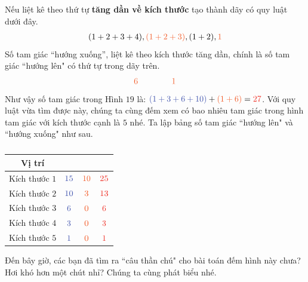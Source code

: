 Nếu liệt kê theo thứ tự {\bf\color{toancuabi} tăng dần về kích thước} tạo thành dãy có quy luật dưới đây.
\begin{align*}
	(1+2+3+4), {\color{duongvaotoanhoc}{(1+2+3)}}, (1+2), {\color{duongvaotoanhoc}{1}}
\end{align*}
Số tam giác “hướng xuống”, liệt kê theo kích thước tăng dần, chính là số tam giác ``hướng lên" có thứ tự {\color{duongvaotoanhoc}{chẵn}} trong dãy trên.
\begin{align*}
	{\color{duongvaotoanhoc}{6}	\qquad \qquad	1 }
\end{align*}
Như vậy số tam giác trong Hình $19$ là: ${\color{timhieukhoahoc}{(1+3+6+10)}} + {\color{duongvaotoanhoc}{(1+6)}} = {\color{toanhocdoisong}{27}}$.
\vskip 0.1cm
Với quy luật vừa tìm được này, chúng ta cùng đếm xem có bao nhiêu tam giác trong hình tam giác với kích thước cạnh là $5$ nhé.
Ta lập bảng số tam giác ``hướng lên" và ``hướng xuống" như sau.
	\begin{table}[H]
	\vspace*{-5pt}
	\centering
	\captionsetup{labelformat= empty, justification=centering}
	\setlength{\tabcolsep}{5pt}
	\renewcommand{\arraystretch}{1.3}
	\begin{tabular}{|c|c|c|c|}
		\hline
		Vị trí & {\color{timhieukhoahoc}{Lên}}  & {\color{duongvaotoanhoc}{Xuống}} & {\color{toanhocdoisong}{Tổng}}\\
		\hline
		Kích thước $1$ & ${\color{timhieukhoahoc}{15}}$ & ${\color{duongvaotoanhoc}{10}}$ &${\color{toanhocdoisong}{25}}$\\
		\hline
		Kích thước $2$ & ${\color{timhieukhoahoc}{10}}$ & ${\color{duongvaotoanhoc}{3}}$ & ${\color{toanhocdoisong}{13}}$\\
		\hline
		Kích thước $3$ & ${\color{timhieukhoahoc}{6}}$ & ${\color{duongvaotoanhoc}{0}}$ & ${\color{toanhocdoisong}{6}}$\\
		\hline
		Kích thước $4$ & ${\color{timhieukhoahoc}{3}}$ & ${\color{duongvaotoanhoc}{0}}$ & ${\color{toanhocdoisong}{3}}$\\
		\hline
		Kích thước $5$ & ${\color{timhieukhoahoc}{1}}$ & ${\color{duongvaotoanhoc}{0}}$ & ${\color{toanhocdoisong}{1}}$ \\
		\hline
	\end{tabular}
	\caption{}
\end{table}
Đến bây giờ, các bạn đã tìm ra ``câu thần chú" cho bài toán đếm hình này chưa? Hơi khó hơn một chút nhỉ? Chúng ta cùng phát biểu nhé.

